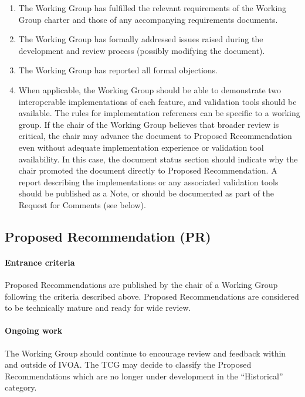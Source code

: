 \documentclass[11pt,a4paper]{ivoa}
\begin{document}
\begin{enumerate}
\item The Working Group has fulfilled the relevant requirements of the
Working Group charter and those of any accompanying requirements
documents.

\item The Working Group has formally addressed issues raised during the
development and review process (possibly modifying the document).

\item The Working Group has reported all formal objections.

\item When applicable, the Working Group should be able to demonstrate two
interoperable implementations of each feature, and validation tools
should be available. The rules for implementation references can be
specific to a working group. If the chair of the Working Group believes
that broader review is critical, the chair may advance the document to
Proposed Recommendation even without adequate implementation experience
or validation tool availability.  In this case, the document status
section should indicate why the chair promoted the document directly to
Proposed Recommendation.  A report describing the implementations or any
associated validation tools should be published as a Note, or should be
documented as part of the Request for Comments (see below).
\end{enumerate}

\subsection{Proposed Recommendation (PR)}
\label{sect:rfc}

\paragraph{Entrance criteria}  Proposed Recommendations are published by the chair
of a Working Group following the criteria described above.  Proposed
Recommendations are considered to be technically mature and ready for
wide review.

\paragraph{Ongoing work}   The Working Group should continue to encourage review
and feedback within and outside of IVOA. The TCG may decide to classify
the Proposed Recommendations which are no longer under development in
the “Historical” category.
\end{document}
